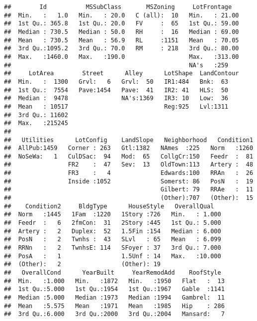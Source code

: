 \documentclass[]{article}
\begin{document}
\begin{verbatim}
##        Id           MSSubClass       MSZoning     LotFrontage    
##  Min.   :   1.0   Min.   : 20.0   C (all):  10   Min.   : 21.00  
##  1st Qu.: 365.8   1st Qu.: 20.0   FV     :  65   1st Qu.: 59.00  
##  Median : 730.5   Median : 50.0   RH     :  16   Median : 69.00  
##  Mean   : 730.5   Mean   : 56.9   RL     :1151   Mean   : 70.05  
##  3rd Qu.:1095.2   3rd Qu.: 70.0   RM     : 218   3rd Qu.: 80.00  
##  Max.   :1460.0   Max.   :190.0                  Max.   :313.00  
##                                                  NA's   :259     
##     LotArea        Street      Alley      LotShape  LandContour
##  Min.   :  1300   Grvl:   6   Grvl:  50   IR1:484   Bnk:  63   
##  1st Qu.:  7554   Pave:1454   Pave:  41   IR2: 41   HLS:  50   
##  Median :  9478               NA's:1369   IR3: 10   Low:  36   
##  Mean   : 10517                           Reg:925   Lvl:1311   
##  3rd Qu.: 11602                                                
##  Max.   :215245                                                
##                                                                
##   Utilities      LotConfig    LandSlope   Neighborhood   Condition1  
##  AllPub:1459   Corner : 263   Gtl:1382   NAmes  :225   Norm   :1260  
##  NoSeWa:   1   CulDSac:  94   Mod:  65   CollgCr:150   Feedr  :  81  
##                FR2    :  47   Sev:  13   OldTown:113   Artery :  48  
##                FR3    :   4              Edwards:100   RRAn   :  26  
##                Inside :1052              Somerst: 86   PosN   :  19  
##                                          Gilbert: 79   RRAe   :  11  
##                                          (Other):707   (Other):  15  
##    Condition2     BldgType      HouseStyle   OverallQual    
##  Norm   :1445   1Fam  :1220   1Story :726   Min.   : 1.000  
##  Feedr  :   6   2fmCon:  31   2Story :445   1st Qu.: 5.000  
##  Artery :   2   Duplex:  52   1.5Fin :154   Median : 6.000  
##  PosN   :   2   Twnhs :  43   SLvl   : 65   Mean   : 6.099  
##  RRNn   :   2   TwnhsE: 114   SFoyer : 37   3rd Qu.: 7.000  
##  PosA   :   1                 1.5Unf : 14   Max.   :10.000  
##  (Other):   2                 (Other): 19                   
##   OverallCond      YearBuilt     YearRemodAdd    RoofStyle   
##  Min.   :1.000   Min.   :1872   Min.   :1950   Flat   :  13  
##  1st Qu.:5.000   1st Qu.:1954   1st Qu.:1967   Gable  :1141  
##  Median :5.000   Median :1973   Median :1994   Gambrel:  11  
##  Mean   :5.575   Mean   :1971   Mean   :1985   Hip    : 286  
##  3rd Qu.:6.000   3rd Qu.:2000   3rd Qu.:2004   Mansard:   7  

\end{verbatim}
\end{document}
